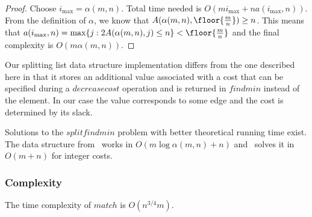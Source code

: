 \begin{proof}
    Choose $i_{\max} = \alpha(m,n)$. Total time needed is $O(mi_{\max} + na(i_{\max},n))$. From the definition of $\alpha$, we know that $A(\alpha(m,n), \floor{\frac{m}{n}}) \geq n$. This means that $a(i_{\max},n) = \max \{ j: 2A(\alpha(m,n), j) \leq n \} < \floor{\frac{m}{n}}$ and the final complexity is $O(m\alpha(m,n))$.
\end{proof}

Our splitting list data structure implementation differs from the one described here in that it stores an additional value associated with a cost that can be specified during a $decreasecost$ operation and is returned in $findmin$ instead of the element. In our case the value corresponds to some edge and the cost is determined by its slack.


Solutions to the $splitfindmin$ problem with better theoretical running time exist. The data structure from~\cite{pettie2005sensitivity} works in $O(m \log \alpha(m, n) + n)$ and~\cite{thorup2007equivalence} solves it in $O(m + n)$ for integer costs.

\subsubsection{Complexity}

\begin{theorem}
    The time complexity of $match$ is $O(n^{3/4}m)$.
\end{theorem}

